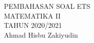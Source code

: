 \documentclass{article}
\begin{document}
 \begin{titlepage}
    \vspace*{\fill}
    \begin{center}
      \Huge {PEMBAHASAN SOAL ETS \\ MATEMATIKA II \\ TAHUN 2020/2021}\\[0.4 cm]
      \huge {Ahmad Hisbu Zakiyudin}
    \end{center}
    \vspace*{\fill}
  \end{titlepage}
\makeatletter
\renewcommand*\env@matrix[1][*\c@MaxMatrixCols c]{%
  \hskip -\arraycolsep
  \let\@ifnextchar\new@ifnextchar
  \array{#1}}
\makeatother
\newcount\arrowcount
\newcommand\arrows[1]{
        \global\arrowcount#1
        \ifnum\arrowcount>0
                \begin{matrix}[c]
                \expandafter\nextarrow
        \fi
}

\newcommand\nextarrow[1]{
        \global\advance\arrowcount-1
        \ifx\relax#1\relax\else \xrightarrow{#1}\fi
        \ifnum\arrowcount=0
                \end{matrix}
        \else
                \\
                \expandafter\nextarrow
        \fi
}
\newpage
{}
\end{document}
